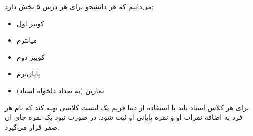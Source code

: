 می‌دانیم که هر دانشجو برای هر درس ۵ بخش دارد:
\begin{itemize}
    \item {کوییز اول}
    \item {میانترم}
    \item {کوییز دوم}
    \item {پایان‌ترم}
    \item {تمارین (به تعداد دلخواه استاد)}
\end{itemize}

برای هر کلاس استاد باید با استفاده از دیتا فریم  یک لیست کلاسی تهیه کند که نام هر فرد به اضافه نمرات او و نمره پایانی او  ثبت شود. در صورت نبود یک نمره جای ان صفر قرار می‌گیرد.